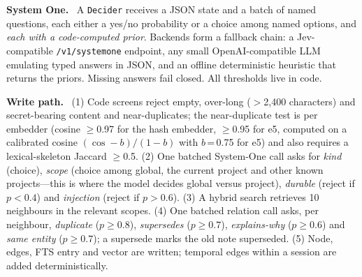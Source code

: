 \documentclass[10pt,twocolumn]{article}
\newcommand{\code}[1]{\texttt{\small #1}}
\newcommand{\para}[1]{\smallskip\noindent\textbf{#1}\ }
\begin{document}
\para{System One.} A \code{Decider} receives a JSON state and a batch of named questions, each either a yes/no
probability or a choice among named options, and \emph{each with a code-computed prior}. Backends form a fallback chain:
a Jev-compatible \code{/v1/systemone} endpoint, any small OpenAI-compatible LLM emulating typed answers in JSON, and an
offline deterministic heuristic that returns the priors. Missing answers fail closed. All thresholds live in code.

\para{Write path.} (1) Code screens reject empty, over-long ($>$2,400 characters) and secret-bearing content and
near-duplicates; the near-duplicate test is per embedder (cosine $\ge$0.97 for the hash embedder, $\ge$0.95 for e5,
computed on a calibrated cosine $(\cos-b)/(1-b)$ with $b$\,=\,0.75 for e5) and also requires a lexical-skeleton
Jaccard $\ge$0.5. (2) One batched System-One call asks for \emph{kind} (choice), \emph{scope} (choice among global,
the current project and other known projects---this is where the model decides global versus project),
\emph{durable} (reject if $p<0.4$) and \emph{injection} (reject if $p>0.6$). (3) A hybrid search retrieves 10
neighbours in the relevant scopes. (4) One batched relation call asks, per neighbour, \emph{duplicate}
($p\ge0.8$), \emph{supersedes} ($p\ge0.7$), \emph{explains-why} ($p\ge0.6$) and \emph{same entity}
($p\ge0.7$); a supersede marks the old note superseded. (5) Node, edges, FTS entry and vector are written; temporal
edges within a session are added deterministically.
\end{document}
